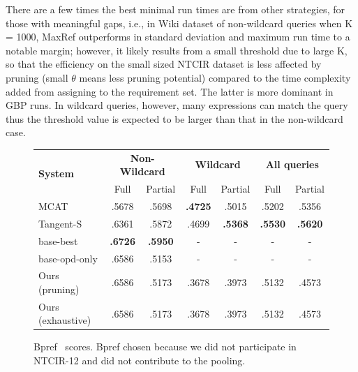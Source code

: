 \documentclass[runningheads]{llncs}
\begin{document}
There are a few times the best minimal run times are from other strategies, for those with meaningful gaps, i.e., in Wiki dataset of non-wildcard queries when K = 1000, MaxRef outperforms in standard deviation and maximum run time to a notable margin; however, it likely results from a small threshold due to large K, so that the efficiency on the small sized NTCIR dataset is less affected by pruning (small $\theta$ means less pruning potential) compared to the time complexity added from assigning to the requirement set. The latter is more dominant in GBP runs. In wildcard queries, however, many expressions can match the query thus the threshold value is expected to be larger than that in the non-wildcard case.
\begin{figure}[!t]
\begin{center}


	\begin{tabular}{l|cc|cc|cc}
	\toprule
	\multirow{2}{*}{\bf{System}}
	& \multicolumn{2}{c|}{\bf Non-Wildcard}
	& \multicolumn{2}{c|}{\bf Wildcard}
	& \multicolumn{2}{c}{\bf All queries} \\
	& Full& Partial
	& Full& Partial
	& Full& Partial \\
 	\toprule
 	MCAT                &     .5678 &     .5698 & \bf .4725 &     .5015 &     .5202 &     .5356 \\
{Tangent-S} &     .6361 &     .5872 &     .4699 & \bf .5368 & \bf .5530 & \bf .5620 \\
{base-best} & \bf .6726 & \bf .5950 &     -     &      -    &      -    &       -   \\
{base-opd-only} & .6586 &   .5153 &     -     &      -    &      -    &       -   \\
 	Ours (pruning)&     .6586 &     .5173 &     .3678 &     .3973 &     .5132 &     .4573 \\
 	Ours (exhaustive)&     .6586 &     .5173 &     .3678 &     .3973 &     .5132 &     .4573 \\
 	\bottomrule
	\end{tabular}

\end{center}
\caption{Bpref~\cite{buckley2004retrieval} scores. Bpref chosen because we did not participate in NTCIR-12 and did not contribute to the pooling.
}
\label{bpref}
\end{figure}
\end{document}

